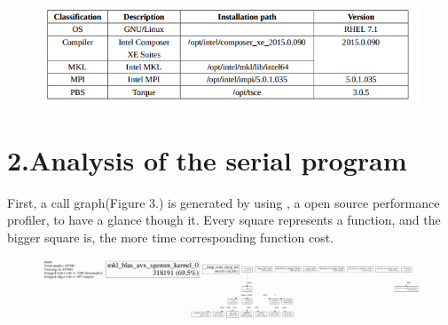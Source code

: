 \documentclass{article}
\begin{document}
\begin{figure}[tbp]%
\begin{mdcenter}%

\noindent{}\includegraphics[keepaspectratio=true,width=\dimmin{}{\dimwidth{0.90}}]{images/2016-02-18-23-13-11-}{}%

\mdhr{}%

\noindent{}%
\end{mdcenter}\label{fig-myfigure}%
\end{figure}%

\section{2.\hspace*{0.5em}Analysis of the serial program}\label{sec-analysis-of-the-serial-program}%

\noindent{}First, a call graph(Figure 3.) is generated by using ,
 a open source performance profiler, to have a glance though it. Every square represents a function, and the bigger square is, the more time corresponding function cost.%

\begin{figure}[tbp]%
\begin{mdcenter}%

\noindent{}\includegraphics[keepaspectratio=true,width=\dimmin{}{\dimwidth{0.90}}]{images/100001994364201}{}%

\mdhr{}%

\noindent{}%
\end{mdcenter}\label{fig-myfigure}%
\end{figure}%
\end{document}
